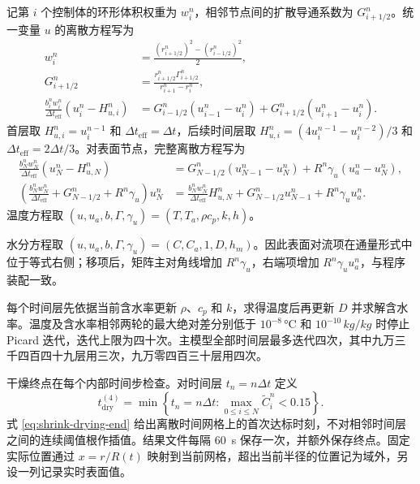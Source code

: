 \documentclass[withoutpreface,bwprint]{cumcmthesis}
\begin{document}
记第 \(i\) 个控制体的环形体积权重为 \(w_i^n\)，相邻节点间的扩散导通系数为 \(G_{i+1/2}^n\)。统一变量 \(u\) 的离散方程写为
\begin{align}
w_i^n&=\frac{\left(r_{i+1/2}^n\right)^2-\left(r_{i-1/2}^n\right)^2}{2},\\
G_{i+1/2}^n&=
\frac{r_{i+1/2}^n\Gamma_{i+1/2}^n}
{r_{i+1}^n-r_i^n},\\
\frac{b_i^n w_i^n}{\Delta t_{\mathrm{eff}}}
\left(u_i^n-H_{u,i}^n\right)
&=G_{i-1/2}^n\left(u_{i-1}^n-u_i^n\right)
+G_{i+1/2}^n\left(u_{i+1}^n-u_i^n\right).
\label{eq:q4-fvm}
\end{align}
首层取 \(H_{u,i}^n=u_i^{n-1}\) 和 \(\Delta t_{\mathrm{eff}}=\Delta t\)，后续时间层取 \(H_{u,i}^n=(4u_i^{n-1}-u_i^{n-2})/3\) 和 \(\Delta t_{\mathrm{eff}}=2\Delta t/3\)。对表面节点，完整离散方程写为
\begin{align}
\frac{b_N^n w_N^n}{\Delta t_{\mathrm{eff}}}
\left(u_N^n-H_{u,N}^n\right)
&=G_{N-1/2}^n\left(u_{N-1}^n-u_N^n\right)
+R^n\gamma_u\left(u_a^n-u_N^n\right),\\
\left(
\frac{b_N^n w_N^n}{\Delta t_{\mathrm{eff}}}
+G_{N-1/2}^n+R^n\gamma_u
\right)u_N^n
&=\frac{b_N^n w_N^n}{\Delta t_{\mathrm{eff}}}H_{u,N}^n
+G_{N-1/2}^n u_{N-1}^n+R^n\gamma_u u_a^n.
\label{eq:q4-surface-node}
\end{align}
温度方程取 \((u,u_a,b,\Gamma,\gamma_u)=(T,T_a,\rho c_p,k,h)\)。

水分方程取 \((u,u_a,b,\Gamma,\gamma_u)=(C,C_a,1,D,h_m)\)。因此表面对流项在通量形式中位于等式右侧；移项后，矩阵主对角线增加 \(R^n\gamma_u\)，右端项增加 \(R^n\gamma_u u_a^n\)，与程序装配一致。

每个时间层先依据当前含水率更新 \(\rho\)、\(c_p\) 和 \(k\)，求得温度后再更新 \(D\) 并求解含水率。温度及含水率相邻两轮的最大绝对差分别低于 \(10^{-8}\,\si{\degreeCelsius}\) 和 \(10^{-10}\,\si{kg/kg}\) 时停止 Picard 迭代，迭代上限为四十次。主模型全部时间层最多迭代四次，其中九万三千四百四十九层用三次，九万零四百三十层用四次。

干燥终点在每个内部时间步检查。对时间层 \(t_n=n\Delta t\) 定义
\begin{equation}
t_{\mathrm{dry}}^{(4)}
=
\min\left\{
t_n=n\Delta t:
\max_{0\leq i\leq N}\widetilde{C}_i^n<0.15
\right\}.
\label{eq:shrink-drying-end}
\end{equation}
式 \ref{eq:shrink-drying-end} 给出离散时间网格上的首次达标时刻，不对相邻时间层之间的连续阈值根作插值。结果文件每隔 \SI{60}{s} 保存一次，并额外保存终点。固定实际位置通过 \(x=r/R(t)\) 映射到当前网格，超出当前半径的位置记为域外，另设一列记录实时表面值。
\end{document}
